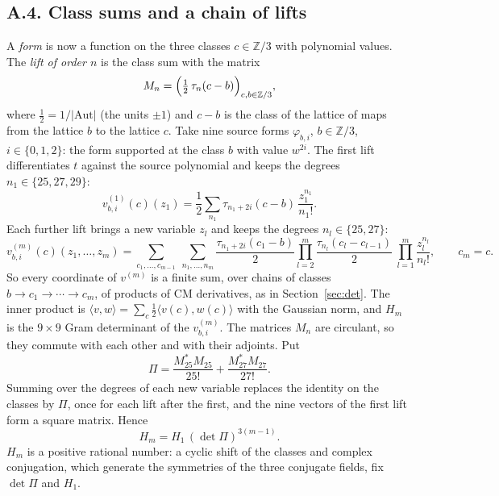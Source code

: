 \documentclass[11pt]{amsart}
\numberwithin{equation}{section}
\theoremstyle{definition}
\theoremstyle{remark}
\newcommand{\Z}{\mathbb Z}
\begin{document}
\subsection*{A.4. Class sums and a chain of lifts}
A \emph{form} is now a function on the three classes $c\in\Z/3$ with polynomial values. The \emph{lift of order $n$} is the class sum with the matrix
\begin{equation}\label{eq:exM}
 M_n=\Bigl(\tfrac12\,\tau_n(c-b)\Bigr)_{c,b\in\Z/3},
\end{equation}
where $\frac12=1/|\mathrm{Aut}|$ (the units $\pm1$) and $c-b$ is the class of the lattice of maps from the lattice $b$ to the lattice $c$. Take nine source forms $\varphi_{b,i}$, $b\in\Z/3$, $i\in\{0,1,2\}$: the form supported at the class $b$ with value $w^{2i}$. The first lift differentiates $t$ against the source polynomial and keeps the degrees $n_1\in\{25,27,29\}$:
\begin{equation}\label{eq:exlift1}
 v^{(1)}_{b,i}(c)(z_1)=\frac12\sum_{n_1}\tau_{n_1+2i}(c-b)\,\frac{z_1^{n_1}}{n_1!}.
\end{equation}
Each further lift brings a new variable $z_l$ and keeps the degrees $n_l\in\{25,27\}$:
\begin{equation}\label{eq:exliftm}
 v^{(m)}_{b,i}(c)(z_1,\dots,z_m)=\sum_{c_1,\dots,c_{m-1}}\ \sum_{n_1,\dots,n_m}\frac{\tau_{n_1+2i}(c_1-b)}2\prod_{l=2}^m\frac{\tau_{n_l}(c_l-c_{l-1})}2\ \prod_{l=1}^m\frac{z_l^{n_l}}{n_l!},\qquad c_m=c .
\end{equation}
So every coordinate of $v^{(m)}$ is a finite sum, over chains of classes $b\to c_1\to\cdots\to c_m$, of products of CM derivatives, as in Section~\ref{sec:det}. The inner product is $\langle v,w\rangle=\sum_c\frac12\langle v(c),w(c)\rangle$ with the Gaussian norm, and $H_m$ is the $9\times9$ Gram determinant of the $v^{(m)}_{b,i}$. The matrices $M_n$ are circulant, so they commute with each other and with their adjoints. Put
\begin{equation}\label{eq:exQ}
 \Pi=\frac{M_{25}^*M_{25}}{25!}+\frac{M_{27}^*M_{27}}{27!}.
\end{equation}
Summing over the degrees of each new variable replaces the identity on the classes by $\Pi$, once for each lift after the first, and the nine vectors of the first lift form a square matrix. Hence
\begin{equation}\label{eq:exHm}
 H_m=H_1\,(\det\Pi)^{3(m-1)} .
\end{equation}
$H_m$ is a positive rational number: a cyclic shift of the classes and complex conjugation, which generate the symmetries of the three conjugate fields, fix $\det\Pi$ and $H_1$.
\end{document}
